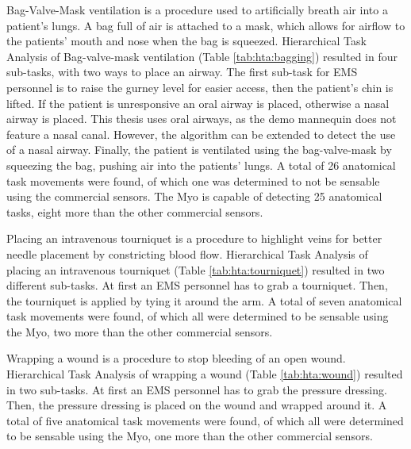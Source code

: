 \par Bag-Valve-Mask ventilation is a procedure used to artificially breath air into a patient's lungs. A bag full of air is attached to a mask, which allows for airflow to the patients' mouth and nose when the bag is squeezed. Hierarchical Task Analysis of Bag-valve-mask ventilation (Table \ref{tab:hta:bagging}) resulted in four sub-tasks, with two ways to place an airway. The first sub-task for EMS personnel is to raise the gurney level for easier access, then the patient's chin is lifted. If the patient is unresponsive an oral airway is placed, otherwise a nasal airway is placed. This thesis uses oral airways, as the demo mannequin does not feature a nasal canal. However, the algorithm can be extended to detect the use of a nasal airway. Finally, the patient is ventilated using the bag-valve-mask by squeezing the bag, pushing air into the patients' lungs. A total of 26 anatomical task movements were found, of which one was determined to not be sensable using the commercial sensors. The Myo is capable of detecting 25 anatomical tasks, eight more than the other commercial sensors.
\par Placing an intravenous tourniquet is a procedure to highlight veins for better needle placement by constricting blood flow. Hierarchical Task Analysis of placing an intravenous tourniquet (Table \ref{tab:hta:tourniquet}) resulted in two different sub-tasks. At first an EMS personnel has to grab a tourniquet. Then, the tourniquet is applied by tying it around the arm. A total of seven anatomical task movements were found, of which all were determined to be sensable using the Myo, two more than the other commercial sensors.
\par Wrapping a wound is a procedure to stop bleeding of an open wound. Hierarchical Task Analysis of wrapping a wound (Table \ref{tab:hta:wound}) resulted in two sub-tasks. At first an EMS personnel has to grab the pressure dressing. Then, the pressure dressing is placed on the wound and wrapped around it. A total of five anatomical task movements were found, of which all were determined to be sensable using the Myo, one more than the other commercial sensors.
\newcommand*\rot{\multicolumn{1}{R{45}{1em}}}
